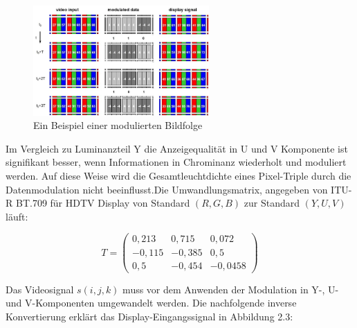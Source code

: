 \begin{figure}[htb]
	\centering 
	\includegraphics[keepaspectratio,width=0.6\textwidth]{images/2_DaViD/David4.jpg}
	\caption{Ein Beispiel einer modulierten Bildfolge}
	\label{fig:David4}
\end{figure}

Im Vergleich zu Luminanzteil Y die Anzeigequalität in U und V Komponente ist signifikant besser, wenn Informationen in Chrominanz wiederholt und moduliert werden. Auf diese Weise wird die Gesamtleuchtdichte eines Pixel-Triple durch die Datenmodulation nicht beeinflusst.Die Umwandlungsmatrix, angegeben von \gls{ITU-R BT.709} für \gls{HDTV} Display von Standard $(R,G,B)$ zur Standard $(Y,U,V)$ läuft:

\begin{equation}
   T = \begin{pmatrix}
   0,213 & 0,715 & 0,072 \\
   -0,115& -0,385& 0,5	\\
   0,5   & -0,454& -0,0458
\end{pmatrix}  
\end{equation}

Das Videosignal $s(i,j,k)$ muss vor dem Anwenden der Modulation in Y-, U- und V-Komponenten umgewandelt werden. Die nachfolgende inverse Konvertierung erklärt das Display-Eingangssignal in Abbildung 2.3:

